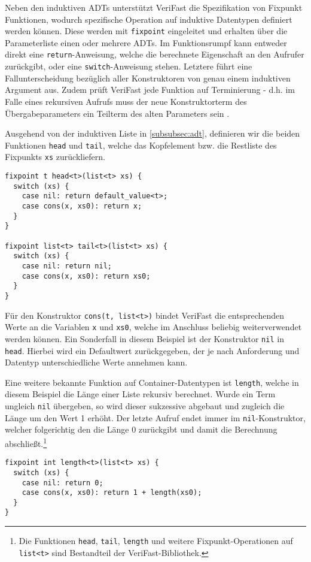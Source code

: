 Neben den induktiven ADTs unterstützt VeriFast die Spezifikation von Fixpunkt Funktionen, wodurch spezifische Operation auf induktive Datentypen definiert werden können. Diese werden mit \texttt{fixpoint} eingeleitet und erhalten über die Parameterliste einen oder mehrere ADTs. Im Funktionsrumpf kann entweder direkt eine \texttt{return}-Anweisung, welche die berechnete Eigenschaft an den Aufrufer zurückgibt, oder eine \texttt{switch}-Anweisung stehen. Letztere führt eine Fallunterscheidung bezüglich aller Konstruktoren von genau einem induktiven Argument aus. Zudem prüft VeriFast jede Funktion auf Terminierung - d.h. im Falle eines rekursiven Aufrufs muss der neue Konstruktorterm des Übergabeparameters ein Teilterm des alten Parameters sein \cite{Jacobs2010}.

Ausgehend von der induktiven Liste in \cref{subsubsec:adt}, definieren wir die beiden Funktionen \texttt{head} und \texttt{tail}, welche das Kopfelement bzw. die Restliste des Fixpunkts \texttt{xs} zurückliefern.

\begin{lstlisting}
fixpoint t head<t>(list<t> xs) {
  switch (xs) {
    case nil: return default_value<t>;
    case cons(x, xs0): return x;
  }
}

fixpoint list<t> tail<t>(list<t> xs) {
  switch (xs) {
    case nil: return nil;
    case cons(x, xs0): return xs0;
  }
}
\end{lstlisting}

\noindent
Für den Konstruktor \texttt{cons(t, list<t>)} bindet VeriFast die entsprechenden Werte an die Variablen \texttt{x} und \texttt{xs0}, welche im Anschluss beliebig weiterverwendet werden können. Ein Sonderfall in diesem Beispiel ist der Konstruktor \texttt{nil} in \texttt{head}. Hierbei wird ein Defaultwert zurückgegeben, der je nach Anforderung und Datentyp unterschiedliche Werte annehmen kann.

Eine weitere bekannte Funktion auf Container-Datentypen ist \texttt{length}, welche in diesem Beispiel die Länge einer Liste rekursiv berechnet. Wurde ein Term ungleich \texttt{nil} übergeben, so wird dieser sukzessive abgebaut und zugleich die Länge um den Wert 1 erhöht. Der letzte Aufruf endet immer im \texttt{nil}-Konstruktor, welcher folgerichtig den die Länge 0 zurückgibt und damit die Berechnung abschließt.\footnote{Die Funktionen \texttt{head}, \texttt{tail}, \texttt{length} und weitere Fixpunkt-Operationen auf \texttt{list<t>} sind Bestandteil der VeriFast-Bibliothek.}

\begin{lstlisting}
fixpoint int length<t>(list<t> xs) {
  switch (xs) {
    case nil: return 0;
    case cons(x, xs0): return 1 + length(xs0);
  }
}
\end{lstlisting}

